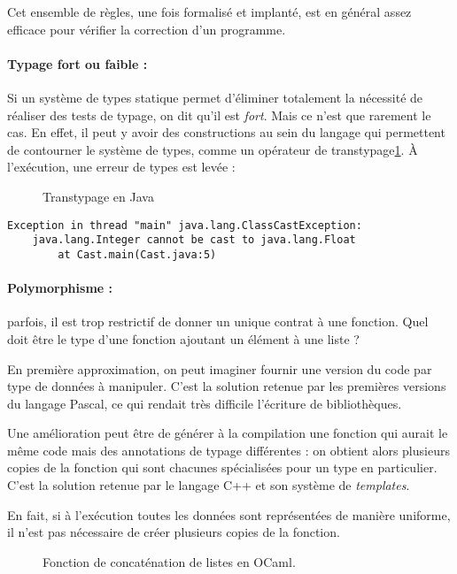 Cet ensemble de règles, une fois formalisé et implanté, est en général assez
efficace pour vérifier la correction d'un programme.

\paragraph{Typage fort ou faible :}

Si un système de types statique permet d'éliminer totalement la nécessité de
réaliser des tests de typage, on dit qu'il est \emph{fort}. Mais ce n'est que
rarement le cas. En effet, il peut y avoir des constructions au sein du langage
qui permettent de contourner le système de types, comme un opérateur de
transtypage\ref{fig:javacast}. À l'exécution, une erreur de types est levée :

\begin{figure}
  \caption{Transtypage en Java}
  \label{fig:javacast}
\end{figure}

\begin{Verbatim}
Exception in thread "main" java.lang.ClassCastException:
    java.lang.Integer cannot be cast to java.lang.Float
        at Cast.main(Cast.java:5)
\end{Verbatim}

\paragraph{Polymorphisme :} parfois, il est trop restrictif de donner un unique
contrat à une fonction. Quel doit être le type d'une fonction ajoutant un
élément à une liste ?

En première approximation, on peut imaginer fournir une version du code par type
de données à manipuler. C'est la solution retenue par les premières versions du
langage Pascal, ce qui rendait très difficile l'écriture de
bibliothèques\cite{PascalNoEscape}.

Une amélioration peut être de générer à la compilation une fonction qui aurait
le même code mais des annotations de typage différentes : on obtient alors
plusieurs copies de la fonction qui sont chacunes spécialisées pour un type en
particulier. C'est la solution retenue par le langage C++ et son système de
\emph{templates}.

En fait, si à l'exécution toutes les données sont représentées de manière
uniforme, il n'est pas nécessaire de créer plusieurs copies de la fonction.

\begin{figure}
  \caption{Fonction de concaténation de listes en OCaml.}
  \label{fig:listappend}
\end{figure}

